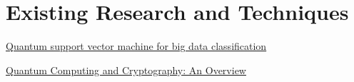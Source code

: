 \section{Existing Research and Techniques} \label{Sec: Existing Research and Techniques}

\begin{framed}
    \href{https://arxiv.org/pdf/1307.0471.pdf}{Quantum support vector machine for big data classification}

    \href{https://link.springer.com/chapter/10.1007/978-3-319-63639-9_4}{Quantum Computing and Cryptography: An Overview}
\end{framed}

